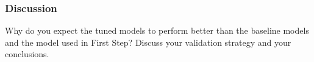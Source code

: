 \documentclass[11pt]{article}
\begin{document}
\subsubsection{Discussion}

Why do you expect the tuned models to perform better than the baseline models and the model used in First Step? Discuss your validation strategy and your conclusions.


  




 
\end{document}
